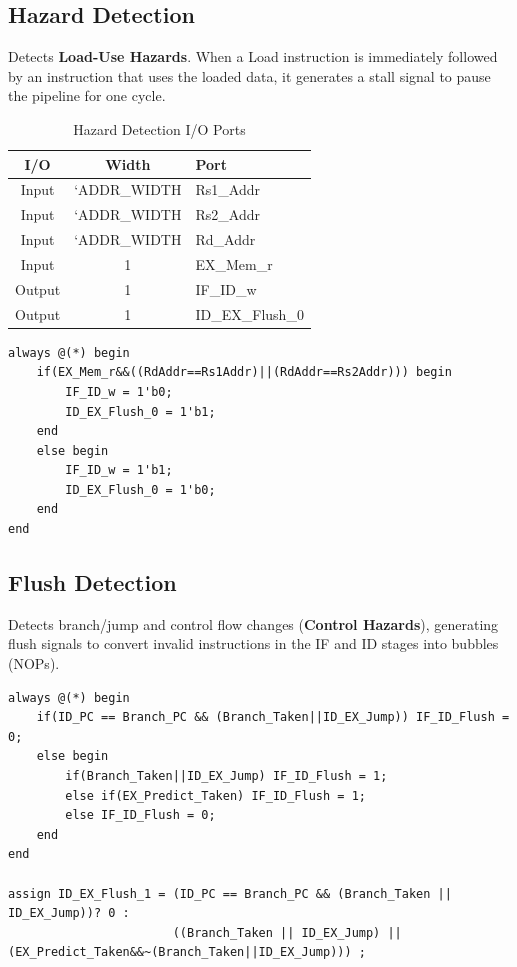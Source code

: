 \documentclass[12pt,a4paper]{report}
\begin{document}
\newpage

\subsection{Hazard Detection}

Detects \textbf{Load-Use Hazards}. When a Load instruction is immediately followed by an instruction that uses the loaded data, it generates a stall signal to pause the pipeline for one cycle.

\begin{table}[htbp]
\centering
\caption{Hazard Detection I/O Ports}
\begin{tabular}{|c|c|l|}
\hline
\textbf{I/O} & \textbf{Width} & \textbf{Port} \\
\hline
Input & `ADDR\_WIDTH & Rs1\_Addr \\
Input & `ADDR\_WIDTH & Rs2\_Addr \\
Input & `ADDR\_WIDTH & Rd\_Addr \\
Input & 1 & EX\_Mem\_r \\
Output & 1 & IF\_ID\_w \\
Output & 1 & ID\_EX\_Flush\_0 \\
\hline
\end{tabular}
\end{table}

\begin{lstlisting}[caption={Hazard Detection Logic}]
always @(*) begin
    if(EX_Mem_r&&((RdAddr==Rs1Addr)||(RdAddr==Rs2Addr))) begin
        IF_ID_w = 1'b0;
        ID_EX_Flush_0 = 1'b1;
    end 
    else begin
        IF_ID_w = 1'b1;
        ID_EX_Flush_0 = 1'b0;
    end
end
\end{lstlisting}

\subsection{Flush Detection}

Detects branch/jump and control flow changes (\textbf{Control Hazards}), generating flush signals to convert invalid instructions in the IF and ID stages into bubbles (NOPs).

\begin{lstlisting}[caption={Flush Detection Logic}]
always @(*) begin
    if(ID_PC == Branch_PC && (Branch_Taken||ID_EX_Jump)) IF_ID_Flush = 0;
    else begin
        if(Branch_Taken||ID_EX_Jump) IF_ID_Flush = 1;
        else if(EX_Predict_Taken) IF_ID_Flush = 1;
        else IF_ID_Flush = 0;
    end
end

assign ID_EX_Flush_1 = (ID_PC == Branch_PC && (Branch_Taken || ID_EX_Jump))? 0 :
                       ((Branch_Taken || ID_EX_Jump) || (EX_Predict_Taken&&~(Branch_Taken||ID_EX_Jump))) ;
\end{lstlisting}
\end{document}
